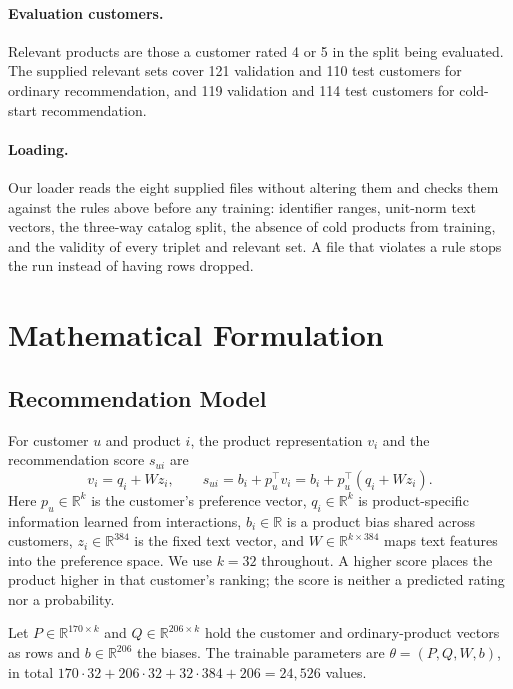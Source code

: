 \documentclass[12pt,a4paper]{article}
\newcommand{\R}{\mathbb{R}}
\begin{document}
\paragraph{Evaluation customers.} Relevant products are those a customer rated
4 or 5 in the split being evaluated. The supplied relevant sets cover 121
validation and 110 test customers for ordinary recommendation, and 119
validation and 114 test customers for cold-start recommendation.

\paragraph{Loading.} Our loader reads the eight supplied files without
altering them and checks them against the rules above before any training:
identifier ranges, unit-norm text vectors, the three-way catalog split, the
absence of cold products from training, and the validity of every triplet and
relevant set. A file that violates a rule stops the run instead of having rows
dropped.

\section{Mathematical Formulation}
\label{sec:math}

\subsection{Recommendation Model}

For customer $u$ and product $i$, the product representation $v_i$ and the
recommendation score $s_{ui}$ are
\begin{equation}
    v_i = q_i + W z_i, \qquad
    s_{ui} = b_i + p_u^\top v_i = b_i + p_u^\top (q_i + W z_i).
    \label{eq:score}
\end{equation}
Here $p_u \in \R^k$ is the customer's preference vector, $q_i \in \R^k$ is
product-specific information learned from interactions, $b_i \in \R$ is a
product bias shared across customers, $z_i \in \R^{384}$ is the fixed text
vector, and $W \in \R^{k \times 384}$ maps text features into the preference
space. We use $k = 32$ throughout. A higher score places the product higher in
that customer's ranking; the score is neither a predicted rating nor a
probability.

Let $P \in \R^{170 \times k}$ and $Q \in \R^{206 \times k}$ hold the customer
and ordinary-product vectors as rows and $b \in \R^{206}$ the biases. The
trainable parameters are $\theta = (P, Q, W, b)$, in total
$170 \cdot 32 + 206 \cdot 32 + 32 \cdot 384 + 206 = 24{,}526$ values.
\end{document}
